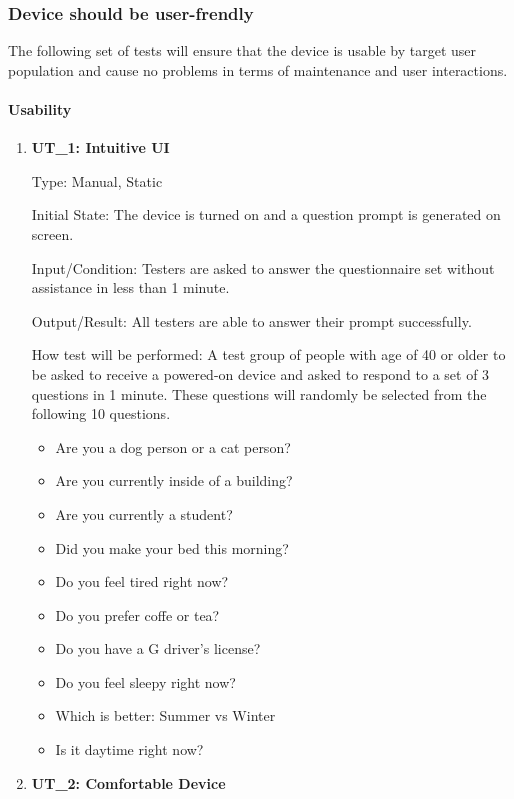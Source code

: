\documentclass[12pt, titlepage]{article}
\begin{document}
\begin{enumerate}
\subsubsection{Device should be user-frendly}
The following set of tests will ensure that the device is usable by target user population and cause no problems in terms of maintenance and user interactions.		

\paragraph{Usability}

\begin{enumerate}

\item\textbf{{UT\_1: Intuitive UI\\}}

Type: Manual, Static
					
Initial State: The device is turned on and a question prompt is generated on screen.
					
Input/Condition: Testers are asked to answer the questionnaire set without assistance in less than 1 minute.
					
Output/Result: All testers are able to answer their prompt successfully.
					
How test will be performed: A test group of people with age of 40 or older to be asked to receive a powered-on device and asked to respond to a set of 3 questions in 1 minute. These questions will randomly be selected from the following 10 questions.

\begin{itemize}
\item Are you a dog person or a cat person?
\item Are you currently inside of a building?
\item Are you currently a student?
\item Did you make your bed this morning?
\item Do you feel tired right now?
\item Do you prefer coffe or tea?
\item Do you have a G driver's license?
\item Do you feel sleepy right now?
\item Which is better: Summer vs Winter
\item Is it daytime right now?
\end{itemize}
					
\item\textbf{{UT\_2: Comfortable Device\\}}


\end{enumerate}
\end{enumerate}
\end{document}
